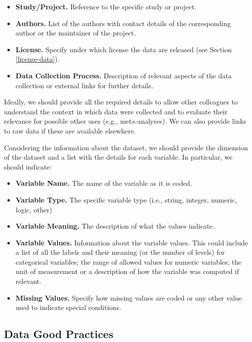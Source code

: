 \documentclass[
  11pt,
]{book}
\providecommand{\tightlist}{%
  \setlength{\itemsep}{0pt}\setlength{\parskip}{0pt}}
\begin{document}
\begin{itemize}
\tightlist
\item
  \textbf{Study/Project.} Reference to the specific study or project.
\item
  \textbf{Authors.} List of the authors with contact details of the corresponding author or the maintainer of the project.
\item
  \textbf{License.} Specify under which license the data are released (see Section \ref{license-data}).
\item
  \textbf{Data Collection Process.} Description of relevant aspects of the data collection or external links for further details.
\end{itemize}

Ideally, we should provide all the required details to allow other colleagues to understand the context in which data were collected and to evaluate their relevance for possible other uses (e.g., meta-analyses). We can also provide links to raw data if these are available elsewhere.

Considering the information about the dataset, we should provide the dimension of the dataset and a list with the details for each variable. In particular, we should indicate:

\begin{itemize}
\tightlist
\item
  \textbf{Variable Name.} The name of the variable as it is coded.
\item
  \textbf{Variable Type.} The specific variable type (i.e., string, integer, numeric, logic, other)
\item
  \textbf{Variable Meaning.} The description of what the values indicate.
\item
  \textbf{Variable Values.} Information about the variable values. This could include a list of all the labels and their meaning (or the number of levels) for categorical variables; the range of allowed values for numeric variables; the unit of measurement or a description of how the variable was computed if relevant.
\item
  \textbf{Missing Values.} Specify how missing values are coded or any other value used to indicate special conditions.
\end{itemize}

\hypertarget{data-good-practices}{%
\subsection{Data Good Practices}\label{data-good-practices}}
\end{document}
